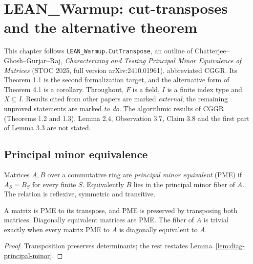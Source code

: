 \chapter{LEAN\_Warmup: cut-transposes and the alternative theorem}

This chapter follows \texttt{LEAN\_Warmup.CutTranspose}, an outline of
Chatterjee--Ghosh--Gurjar--Raj, \emph{Characterizing and Testing Principal Minor Equivalence
of Matrices} (STOC 2025, full version arXiv:2410.01961), abbreviated CGGR. Its Theorem 1.1
is the second formalization target, and the alternative form of Theorem 4.1 is a corollary.
Throughout, $F$ is a field, $I$ is a finite index type and $X\subseteq I$. Results cited from
other papers are marked \emph{external}; the remaining unproved statements are marked
\emph{to do}. The algorithmic results of CGGR (Theorems 1.2 and 1.3), Lemma 2.4,
Observation 3.7, Claim 3.8 and the first part of Lemma 3.3 are not stated.

\section{Principal minor equivalence}

\begin{definition}
\label{def:pme}
\leanok
{}
Matrices $A,B$ over a commutative ring are \emph{principal minor equivalent} (PME) if
$A_S=B_S$ for every finite $S$. Equivalently $B$ lies in the principal minor fiber of $A$.
The relation is reflexive, symmetric and transitive.
\end{definition}

\begin{lemma}
\label{lem:pme-basic}
\leanok
{}
A matrix is PME to its transpose, and PME is preserved by transposing both matrices.
Diagonally equivalent matrices are PME. The fiber of $A$ is trivial exactly when every
matrix PME to $A$ is diagonally equivalent to $A$.
\end{lemma}
\begin{proof}
\leanok
Transposition preserves determinants; the rest restates Lemma~\ref{lem:diag-principal-minor}.
\end{proof}

